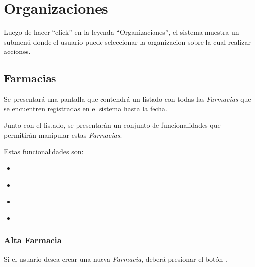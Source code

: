 \documentclass[a4paper,10pt,spanish]{sphinxmanual}
\begin{document}
\chapter{Organizaciones}
\label{organizaciones::doc}\label{organizaciones:organizaciones}
Luego de hacer “click” en  la leyenda ``Organizaciones'', el sistema muestra un submenú donde el usuario puede seleccionar la organizacion sobre la cual realizar acciones.


\section{Farmacias}
\label{farmacias:farmacias}\label{farmacias::doc}
Se presentará una pantalla que contendrá un listado con todas las \emph{Farmacias} que se encuentren registradas en el sistema hasta la fecha.


Junto con el listado, se presentarán un conjunto de funcionalidades que permitirán manipular estas \emph{Farmacias}.

Estas funcionalidades son:
\begin{itemize}
\item {} 
{\hyperref[farmacias:alta\string-farmacia]{}}

\item {} 
{\hyperref[farmacias:modificar\string-farmacia]{}}

\item {} 
{\hyperref[farmacias:eliminar\string-farmacia]{}}

\item {} 
{\hyperref[farmacias:formulario\string-busqueda\string-farmacia]{}}

\end{itemize}


\subsection{Alta Farmacia}
\label{farmacias:alta-farmacia}\label{farmacias:id1}
Si el usuario desea crear una nueva \emph{Farmacia}, deberá presionar el botón .
\end{document}

